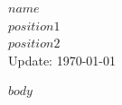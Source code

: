 \documentclass[11pt, a4paper]{article}
\begin{document}
\begin{center}
  {\LARGE $name$}\\[0.3em]
  $position1$\\
  $position2$\\
  Update: \today
\end{center}

\vspace{1em}

$body$
\end{document}
